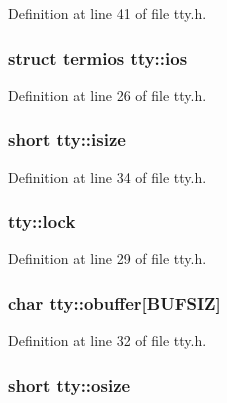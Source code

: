 Definition at line 41 of file tty.\+h.

\hypertarget{structtty_a10958fdd6a24123e3522b806a8647656}{
\subsubsection[{ios}]{\setlength{\rightskip}{0pt plus 5cm}struct termios tty\+::ios}}\label{structtty_a10958fdd6a24123e3522b806a8647656}


Definition at line 26 of file tty.\+h.

\hypertarget{structtty_a25ab11cf5b7109480eb6f2e4f05efe4f}{
\subsubsection[{isize}]{\setlength{\rightskip}{0pt plus 5cm}short tty\+::isize}}\label{structtty_a25ab11cf5b7109480eb6f2e4f05efe4f}


Definition at line 34 of file tty.\+h.

\hypertarget{structtty_a37c81cc0b682d67ec3d789f061357d77}{
\subsubsection[{lock}]{ tty\+::lock}}\label{structtty_a37c81cc0b682d67ec3d789f061357d77}


Definition at line 29 of file tty.\+h.

\hypertarget{structtty_a739b6ee550a2f4f997637261aed60167}{
\subsubsection[{obuffer}]{\setlength{\rightskip}{0pt plus 5cm}char tty\+::obuffer\mbox{[}B\+U\+F\+S\+I\+Z\mbox{]}}}\label{structtty_a739b6ee550a2f4f997637261aed60167}


Definition at line 32 of file tty.\+h.

\hypertarget{structtty_a94aa6d24908c6976459d187842f1428b}{
\subsubsection[{osize}]{\setlength{\rightskip}{0pt plus 5cm}short tty\+::osize}}\label{structtty_a94aa6d24908c6976459d187842f1428b}


